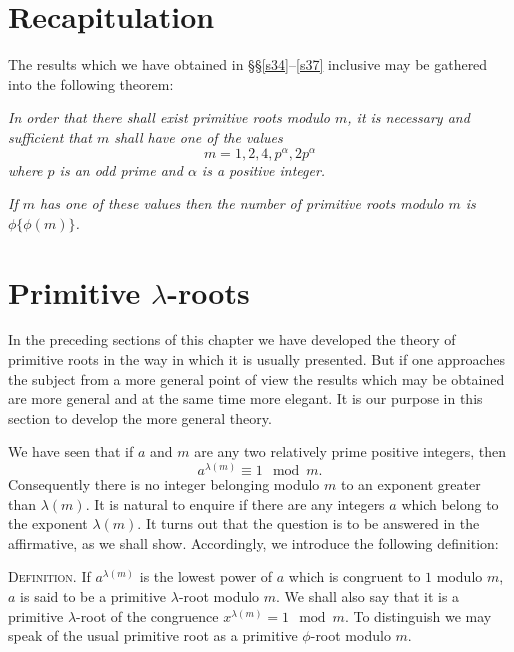 \documentclass[oneside]{book}
\begin{document}
\section{Recapitulation}\label{s38}

The results which we have obtained in \S\S \ref{s34}--\ref{s37}
inclusive may be gathered into the following theorem:

\emph{In order that there shall exist primitive roots modulo $m$, it
is necessary and sufficient that $m$ shall have one of the values}
\begin{equation*}
m = 1, 2, 4, p^\alpha, 2p^\alpha
\end{equation*}
\emph{where $p$ is an odd prime and $\alpha$ is a positive integer.}

\emph{If $m$ has one of these values then the number of primitive
roots modulo $m$ is $\phi\{\phi(m)\}$.}

\section{Primitive $\lambda$-roots}\label{s39}%

In the preceding sections of this chapter we have developed the
theory of primitive roots in the way in which it is usually
presented. But if one approaches the subject from a more general
point of view the results which may be obtained are more general and
at the same time more elegant. It is our purpose in this section to
develop the more general theory.

\smallskip We have seen that if $a$ and $m$ are any two relatively
prime positive integers, then
\begin{equation*}
a^{\lambda(m)} \equiv 1 \mod m.
\end{equation*}
Consequently there is no integer belonging modulo $m$ to an exponent
greater than $\lambda(m)$. It is natural to enquire if there are any
integers $a$ which belong to the exponent $\lambda(m)$. It turns out
that the question is to be answered in the affirmative, as we shall
show. Accordingly, we introduce the following definition:

\smallskip \textsc{Definition.} If $a^{\lambda(m)}$ is the lowest
power of $a$ which is congruent to $1$ modulo $m$, $a$ is said to be
a primitive $\lambda$-root modulo $m$. We shall also say that it is
a primitive $\lambda$-root of the congruence $x^{\lambda(m)} = 1
\mod m$. To distinguish we may speak of the usual primitive root as
a primitive $\phi$-root modulo $m$.%
\end{document}

